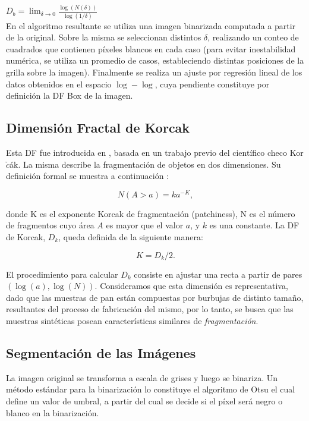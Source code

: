 $D_{b} = \displaystyle\lim_{\delta \to 0}{\frac{\log(N(\delta))}{\log (1/\delta)}}$\\

En el algoritmo resultante se utiliza una imagen binarizada computada a partir de la original. Sobre la misma se seleccionan distintos $\delta$, realizando un conteo de cuadrados que contienen p\'ixeles blancos en cada caso (para evitar inestabilidad num\'erica, se utiliza un promedio de casos, estableciendo distintas posiciones de la grilla sobre la imagen). Finalmente se realiza un ajuste por regresi\'on lineal de los datos obtenidos en el espacio $\log-\log$, cuya pendiente constituye por definici\'on la DF Box de la imagen.

\subsection{Dimensi\'on Fractal de Korcak}
Esta DF fue introducida en \cite{Mandelbrot1983}, basada en un trabajo previo del cient\'ifico checo Kor$\check{c}$\'ak.
La misma describe la fragmentaci\'on de objetos en dos dimensiones.
Su definici\'on formal se muestra a continuación \cite{Imre11}:

$$N(A > a) = k a^{-K},$$

\noindent
donde K es el exponente Korcak de fragmentaci\'on (patchiness), N es el n\'umero de fragmentos cuyo \'area $A$ es mayor que el valor $a$, y $k$ es una constante. La DF de Korcak, $D_{k}$, queda definida de la siguiente manera:

$$K = D_{k}/2.$$

El procedimiento para calcular $D_{k}$ consiste en ajustar una recta a partir de pares $(\log(a),\log(N))$.
Consideramos que esta dimensión es representativa, dado que las muestras de pan est\'an compuestas por burbujas de distinto tama\~no, resultantes del proceso de fabricación del mismo, por lo tanto, se busca que las muestras sint\'eticas posean caracter\'isticas similares de {\em fragmentaci\'on}.

\subsection{Segmentaci\'on de las Im\'agenes}
La imagen original se transforma a escala de grises y luego se binariza.
Un método estándar para la binarización lo constituye el algoritmo de Otsu \cite{Otsu79} el cual define un valor de umbral, a partir del cual se decide si el p\'ixel ser\'a negro o blanco en la binarizaci\'on. 

